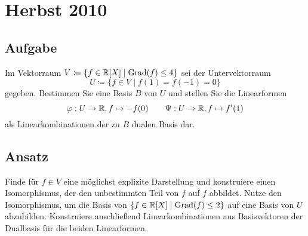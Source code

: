 \newpage


\section{Herbst 2010}

\subsection{Aufgabe}
Im Vektorraum \( V \coloneqq \{ f \in \mathbb{R}[X] \mid \text{Grad}(f) \leq 4 \} \) sei der Untervektorraum
\begin{equation*}
	U \coloneqq \{ f \in V \mid f(1) = f(-1) = 0 \}
\end{equation*}
gegeben. Bestimmen Sie eine Basis \( B \) von \( U \) und stellen Sie die Linearformen
\begin{equation*}
	\varphi: U \to \mathbb{R}, f \mapsto -f(0) \qquad \Psi: U \to \mathbb{R}, f \mapsto f'(1)
\end{equation*}
als Linearkombinationen der zu \( B \) dualen Basis dar.

\subsection{Ansatz}
Finde für \( f \in V \) eine möglichst explizite Darstellung und konstruiere einen Isomorphismus, der den unbestimmten Teil von \( f \) auf \( f \) abbildet. Nutze den Isomorphismus, um die Basis von \( \{ f \in \mathbb{R}[X] \mid \text{Grad}(f) \leq 2 \} \) auf eine Basis von \( U \) abzubilden. Konstruiere anschließend Linearkombinationen aus Basisvektoren der Dualbasis für die beiden Linearformen.

